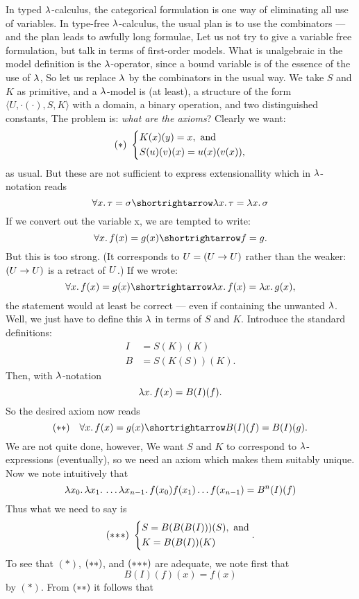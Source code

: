 In typed $\l$-calculus, the categorical formulation is one way of eliminating all use of variables. In type-free $\l$-calculus, the usual plan is to use the combinators --- and the plan leads to awfully long formulae, Let us not try to give a variable free formulation, but talk in terms of first-order models.
What is unalgebraic in the model definition is the $\l$-operator, since a bound variable is of the essence of the use of $\l$, So let us replace $\l$ by the combinators in the usual way. We take $S$ and $K$ as primitive, and a $\l$-model is (at least), a structure of the form $\langle U, \cdot(\cdot), S, K\rangle$ with a domain, a binary operation, and two distinguished constants, The problem is: {\it what are the axioms}? Clearly we want:
%
\[
(*) \,\,
\begin{dcases}
K(x)(y) = x, {\textrm { and}}\\
S(u)(v)(x) = u(x)(v(x)),
\end{dcases}
\]
%
as usual. But these are not sufficient to express extensionallity which in $\l$-notation reads
$$
\forall x.\, \tau = \sigma \imp \lm{x}. \tau = \lm{x}. \sigma
$$
If we convert out the variable x, we are tempted to write:
$$
\forall x.\, f(x) = g(x) \imp f = g.
$$
But this is too strong. (It corresponds to $\U = (\U \to \U)$ rather than the weaker: $(\U \to \U)$ is a retract of $\U$.) If we wrote:
$$
\forall x.\, f(x) = g(x) \imp \lm{x}.f(x) = \lm{x}.g(x),
$$
the statement would at least be correct --- even if containing the unwanted $\l$. Well, we just have to define this $\l$ in terms of $S$ and $K$. Introduce the standard definitions:
\begin{align*}
I &= S(K)(K)\\
B &= S(K(S))(K).
\end{align*}
%
Then, with $\l$-notation
$$
\lm{x}.f(x) = B(I)(f).
$$
So the desired axiom now reads
$$
({\mathrm {**}}) \quad \forall x.\, f(x) = g(x) \imp B(I)(f) = B(I)(g).
$$
We are not quite done, however, We want $S$ and $K$ to correspond to $\l$-expressions (eventually), so we need an axiom which makes them suitably unique. Now we note intuitively that
$$
\lm{x_0}. \lm{x_1}. \dots \lm{x_{n-1}}. f(x_0)f(x_1)\dots f(x_{n-1}) = B^n(I)(f)
$$
Thus what we need to say is
\[
\sss \,\,
\begin{dcases}
S = B(B(B(I)))(S), {\textrm { and}}\\
K = B(B(I))(K)
\end{dcases} .
\]
To see that $(*)$, $\ss$, and $\sss$ are adequate, we note first that
$$
B(I)(f)(x) = f(x)
$$
by $(*)$. From $\ss$ it follows that
